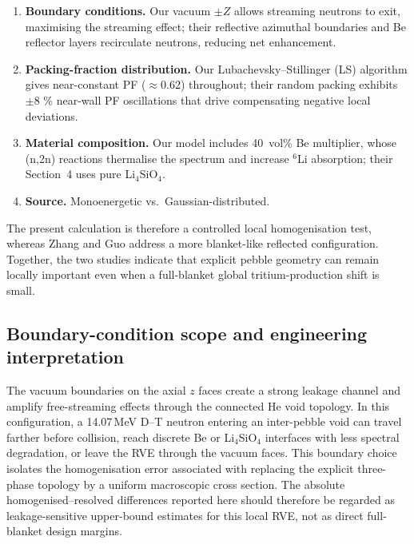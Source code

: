 \documentclass[preprint,12pt]{elsarticle}
\begin{document}
\begin{enumerate}[nosep]
\item \textbf{Boundary conditions.}  Our vacuum $\pm Z$ allows streaming
      neutrons to exit, maximising the streaming effect; their reflective
      azimuthal boundaries and Be reflector layers recirculate neutrons,
      reducing net enhancement.
\item \textbf{Packing-fraction distribution.}  Our Lubachevsky--Stillinger (LS)
      algorithm gives near-constant PF
      ($\approx$0.62) throughout; their random packing exhibits $\pm$8 \%
      near-wall PF oscillations that drive compensating negative local
      deviations.
\item \textbf{Material composition.}  Our model includes 40~vol\% Be
      multiplier, whose (n,2n) reactions thermalise the spectrum and increase
      $^6$Li absorption; their Section~4 uses pure Li$_4$SiO$_4$.
\item \textbf{Source.}  Monoenergetic vs.\ Gaussian-distributed.
\end{enumerate}

The present calculation is therefore a controlled local homogenisation test,
whereas Zhang and Guo address a more blanket-like reflected configuration.
Together, the two studies indicate that explicit pebble geometry can remain
locally important even when a full-blanket global tritium-production shift is small.

\subsection{Boundary-condition scope and engineering interpretation}

The vacuum boundaries on the axial $z$ faces create a strong leakage channel
and amplify free-streaming effects through the connected He void topology.  In
this configuration, a 14.07\,MeV D--T neutron entering an inter-pebble void can
travel farther before collision, reach discrete Be or Li$_4$SiO$_4$ interfaces
with less spectral degradation, or leave the RVE through the vacuum faces.  This
boundary choice isolates the homogenisation error associated with replacing the
explicit three-phase topology by a uniform macroscopic cross section.  The
absolute homogenised--resolved differences reported here should therefore be
regarded as leakage-sensitive upper-bound estimates for this local RVE, not as
direct full-blanket design margins.
\end{document}
